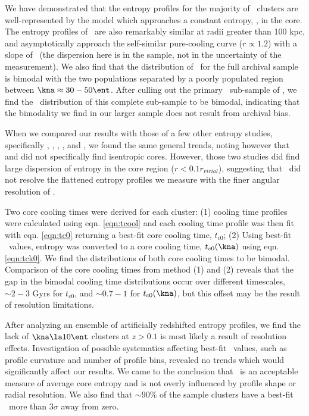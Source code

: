 \documentclass{emulateapj}
\begin{document}
We have demonstrated that the entropy profiles for the majority of
\accept\ clusters are well-represented by the model which approaches a
constant entropy, \kna, in the core. The entropy profiles of
\accept\ are also remarkably similar at radii greater than 100 kpc,
and asymptotically approach the self-similar pure-cooling curve ($r
\propto 1.2$) with a slope of \alphafs\ (the dispersion here is in the
sample, not in the uncertainty of the measurement). We also find that
the distribution of \kna\ for the full archival sample is bimodal with
the two populations separated by a poorly populated region between
$\kna \approx 30-50 \ent$. After culling out the primary
\hifl\ sub-sample of \citet{hiflugcs1}, we find the \kna\ distribution
of this complete sub-sample to be bimodal, indicating that the
bimodality we find in our larger sample does not result from archival
bias.

When we compared our results with those of a few other entropy
studies, specifically \citet{davies00}, \citet{ponman03},
\citet{piffaretti05}, \citet{pratt06}, and \citet{morandi07}, we found
the same general trends, noting however that \citet{piffaretti05} and
\citet{pratt06} did not specifically find isentropic cores. However,
those two studies did find large dispersion of entropy in the core
region ($r < 0.1 r_{virial}$), suggesting that \xmm\ did not resolve
the flattened entropy profiles we measure with the finer angular
resolution of \chandra.

Two core cooling times were derived for each cluster: (1) cooling time
profiles were calculated using eqn. \ref{eqn:tcool} and each cooling
time profile was then fit with eqn. \ref{eqn:tc0} returning a best-fit
core cooling time, $t_{c0}$; (2) Using best-fit \kna\ values, entropy
was converted to a core cooling time, $t_{c0}(\kna)$ using
eqn. \ref{eqn:tck0}. We find the distributions of both core cooling
times to be bimodal. Comparison of the core cooling times from method
(1) and (2) reveals that the gap in the bimodal cooling time
distributions occur over different timescales, $\sim 2-3$ Gyrs for
$t_{c0}$, and $\sim 0.7-1$ for $t_{c0}(\kna)$, but this offset may be
the result of resolution limitations.

After analyzing an ensemble of artificially redshifted entropy
profiles, we find the lack of $\kna \la 10 \ent$ clusters at $z > 0.1$
is most likely a result of resolution effects. Investigation of
possible systematics affecting best-fit \kna\ values, such as profile
curvature and number of profile bins, revealed no trends which would
significantly affect our results. We came to the conclusion that
\kna\ is an acceptable measure of average core entropy and is not
overly influenced by profile shape or radial resolution. We also find
that $\sim90\%$ of the sample clusters have a best-fit \kna\ more than
$3\sigma$ away from zero.
\end{document}
